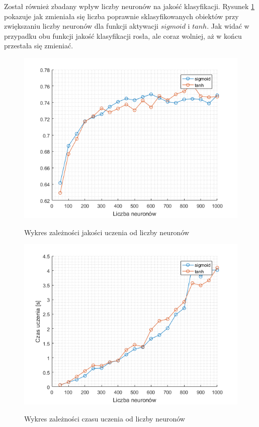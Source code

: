 \documentclass{article}
\begin{document}
Został również zbadany wpływ liczby neuronów na jakość klasyfikacji.
Rysunek \ref{forest_liczba_neuronow} pokazuje jak zmieniała się liczba poprawnie sklasyfikowanych obiektów przy zwiększaniu liczby neuronów dla funkcji aktywacji $sigmoid$ i $tanh$.
Jak widać w przypadku obu funkcji jakość klasyfikacji rosła, ale coraz wolniej, aż w końcu przestała się zmieniać.
\begin{figure}[H]
\centering
\includegraphics[width=\textwidth]{forest_liczba_neuronow.png}
\label{forest_liczba_neuronow}
\caption{Wykres zależności jakości uczenia od liczby neuronów}
\end{figure}

\begin{figure}[H]
\centering
\includegraphics[width=\textwidth]{forest_wydajnosc.png}
\label{forest_wydajnosc}
\caption{Wykres zależności czasu uczenia od liczby neuronów}
\end{figure}
\end{document}
